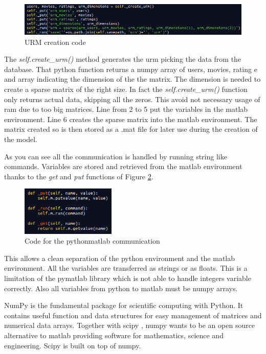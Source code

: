 \begin{figure}
  \centering
  \includegraphics[width=\textwidth]{figures/urm_creation_code.png}
  \caption{URM creation code}
  \label{fig:urm_creation_code}
\end{figure}

The \textit{self.create\_urm()} method generates the urm picking the data from the database. That python function returns a numpy array of users, movies, rating e and array indicating the dimension of the the matrix. The dimension is needed to create a sparse matrix of the right size. In fact the \textit{self.create\_urm()} function only returns actual data, skipping all the zeros. This avoid not necessary usage of ram due to too big matrices. Line from 2 to 5 put the variables in the matlab environment. Line 6 creates the sparse matrix into the matlab environment. The matrix created so is then stored as a .mat file for later use during the creation of the model.

As you can see all the communication is handled by running string like commands. Variables are stored and retrieved from the matlab environment thanks to the \textit{get} and \textit{put} functions of Figure \ref{fig:matlab_put_get_code}.

\begin{figure}
  \centering
  \includegraphics[width=0.4\textwidth]{figures/matlab_put_get_code.png}
  \caption{Code for the python\-matlab communication}
  \label{fig:matlab_put_get_code}
\end{figure}

This allows a clean separation of the python environment and the matlab environment. All the variables are transferred as strings or as floats. This is a limitation of the pymatlab library which is not able to handle integers variable correctly. Also all variables from python to matlab must be numpy \cite{numpy} arrays.

NumPy is the fundamental package for scientific computing with Python. It contains useful function and data structures for easy management of matrices and numerical data arrays. Together with scipy \cite{scipy}, numpy wants to be an open source alternative to matlab providing software for mathematics, science and engineering. Scipy is built on top of numpy.

